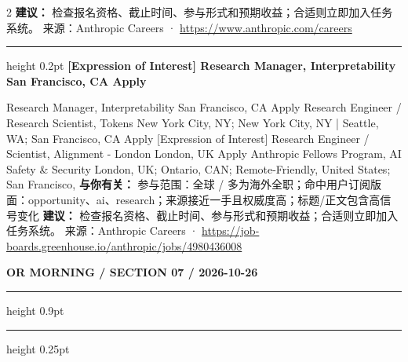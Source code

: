 \documentclass[10.5pt]{ctexart}
\begin{document}
\begin{multicols}{2}
\textbf{建议：} 检查报名资格、截止时间、参与形式和预期收益；合适则立即加入任务系统。
{\footnotesize\color{ormuted} 来源：Anthropic Careers · \url{https://www.anthropic.com/careers}}
\vspace{2mm}
\hrule height 0.2pt
\vspace{2mm}
{\large\bfseries [Expression of Interest] Research Manager, Interpretability San Francisco, CA Apply}\par
[Expression of Interest] Research Manager, Interpretability San Francisco, CA Apply Research Engineer / Research Scientist, Tokens New York City, NY; New York City, NY | Seattle, WA; San Francisco, CA Apply [Expression of Interest] Research Engineer / Scientist, Alignment - London London, UK Apply Anthropic Fellows Program, AI Safety \& Security London, UK; Ontario, CAN; Remote-Friendly, United States; San Francisco, 
\textbf{与你有关：} 参与范围：全球 / 多为海外全职；命中用户订阅版面：opportunity、ai、research；来源接近一手且权威度高；标题/正文包含高信号变化
\textbf{建议：} 检查报名资格、截止时间、参与形式和预期收益；合适则立即加入任务系统。
{\footnotesize\color{ormuted} 来源：Anthropic Careers · \url{https://job-boards.greenhouse.io/anthropic/jobs/4980436008}}
\end{multicols}
\newpage
{\small\bfseries OR MORNING / SECTION 07 / 2026-10-26}
\vspace{2mm}
\hrule height 0.9pt
\vspace{1.5mm}
\hrule height 0.25pt
\vspace{4mm}
\end{document}
